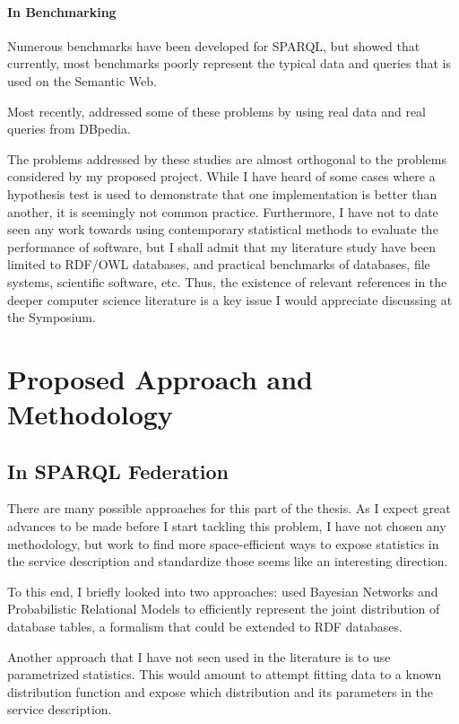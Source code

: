\documentclass{llncs}
\begin{document}
\paragraph{In Benchmarking}

Numerous benchmarks have been developed for SPARQL, but
\cite{Duan:2011:AOC:1989323.1989340} showed that currently, most
benchmarks poorly represent the typical data and queries that is used
on the Semantic Web.

Most recently, \cite{mxro:Morsey2011DBpedia} addressed some of these
problems by using real data and real queries from DBpedia.

The problems addressed by these studies are almost orthogonal to the
problems considered by my proposed project. While I have heard of some
cases where a hypothesis test is used to demonstrate that one
implementation is better than another, it is seemingly not common
practice. Furthermore, I have not to date seen any work towards using
contemporary statistical methods to evaluate the performance of
software, but I shall admit that my literature study have been limited
to RDF/OWL databases, and practical benchmarks of databases, file
systems, scientific software, etc. Thus, the existence of relevant
references in the deeper computer science literature is a key issue I
would appreciate discussing at the Symposium.


\section{Proposed Approach and Methodology}

\subsection{In SPARQL Federation}

There are many possible approaches for this part of the thesis. As I
expect great advances to be made before I start tackling this problem,
I have not chosen any methodology, but work to find more
space-efficient ways to expose statistics in the service description
and standardize those seems like an interesting direction. 

To this end, I briefly looked into two approaches:
\cite{Getoor:2001:SEU:375663.375727} used Bayesian Networks and
Probabilistic Relational Models to efficiently represent the joint
distribution of database tables, a formalism that could be extended to
RDF databases.

Another approach that I have not seen used in the literature is to use
parametrized statistics. This would amount to attempt fitting data to
a known distribution function and expose which distribution and its
parameters in the service description.
\end{document}
